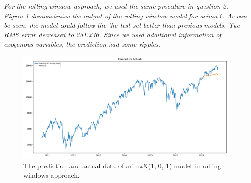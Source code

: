 \textit{For the rolling window approach, we used the same procedure in question 2. Figure \ref{fig:Ass2_Q3_Rolling_Forecast_vs_Actuals} demonstrates the output of the rolling window model for \gls{arima}X. As can be seen, the model could follow the the test set better than previous models. The RMS error decreased to 251.236. Since we used additional information of exogenous variables, the prediction had some ripples.}

\begin{figure}[H]
    \centering
    \begin{minipage}[b]{1\textwidth}
        \includegraphics[width=\textwidth]{manuscript/src/figures/Ass2/Ass2_Q3_Rolling_Forecast_vs_Actuals.png}
    \end{minipage}
    \caption{The prediction and actual data of \gls{arima}X(1, 0, 1) model in rolling windows approach.}
    \label{fig:Ass2_Q3_Rolling_Forecast_vs_Actuals}
\end{figure}








